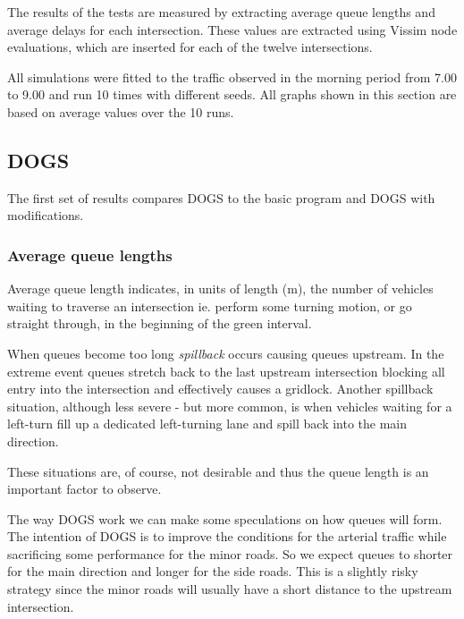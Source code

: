 The results of the tests are measured by extracting average queue lengths and average delays for each intersection. These values are extracted using Vissim node evaluations, which are inserted for each of the twelve intersections.

All simulations were fitted to the traffic observed in the morning period from 7.00 to 9.00 and run 10 times with different seeds. All graphs shown in this section are based on average values over the 10 runs.

\subsection{DOGS}
The first set of results compares DOGS to the basic program and DOGS with modifications.

\subsubsection*{Average queue lengths}
Average queue length indicates, in units of length (m), the number of vehicles waiting to traverse an intersection ie. perform some turning motion, or go straight through, in the beginning of the green interval. 

When queues become too long \textit{spillback} occurs causing queues upstream. In the extreme event queues stretch back to the last upstream intersection blocking all entry into the intersection and effectively causes a gridlock.
Another spillback situation, although less severe - but more common, is when vehicles waiting for a left-turn fill up a dedicated left-turning lane and spill back into the main direction.

These situations are, of course, not desirable and thus the queue length is an important factor to observe.

The way DOGS work we can make some speculations on how queues will form. The intention of DOGS is to improve the conditions for the arterial traffic while sacrificing some performance for the minor roads. So we expect queues to shorter for the main direction and longer for the side roads. This is a slightly risky strategy since the minor roads will usually have a short distance to the upstream intersection.

